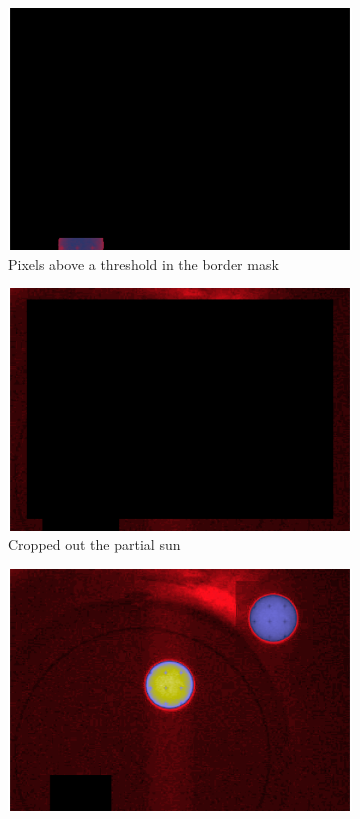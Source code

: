 \documentclass[10pt]{scrartcl}
\begin{document}
\begin{figure}[!ht]
\begin{subfigure}{.49\textwidth}
        \includegraphics[width=1.\textwidth]{../plots_tables_images/whatbordersees.eps}
        \caption{Pixels above a threshold in the border mask}
    \end{subfigure}
    \begin{subfigure}{.49\textwidth}
        \centering
        \includegraphics[width=1.\textwidth]{../plots_tables_images/afterzero.eps}
        \caption{Cropped out the partial sun}
    \end{subfigure}
    \begin{subfigure}{.49\textwidth}
        \centering
        \includegraphics[width=1.\textwidth]{../plots_tables_images/fixedimage.eps}

\end{subfigure}
\end{figure}
\end{document}
